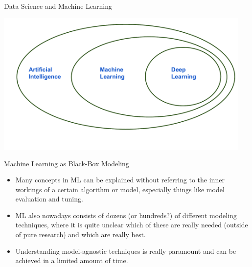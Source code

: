 \begin{frame}{Data Science and Machine Learning}

\scriptsize

\begin{center}
\includegraphics[width=0.95\textwidth]{plots/learning.pdf} 
\end{center}

\normalsize 

\end{frame}

\begin{frame}{Machine Learning as Black-Box Modeling}

\begin{itemize}

\item
  Many concepts in ML can be explained without referring to the inner
  workings of a certain algorithm or model, especially things like model
  evaluation and tuning.
\item
  ML also nowadays consists of dozens (or hundreds?) of different
  modeling techniques, where it is quite unclear which of these are
  really needed (outside of pure research) and which are really best.
\item
  Understanding model-agnostic techniques is really paramount and can be
  achieved in a limited amount of time.
\end{itemize}

\end{frame}

